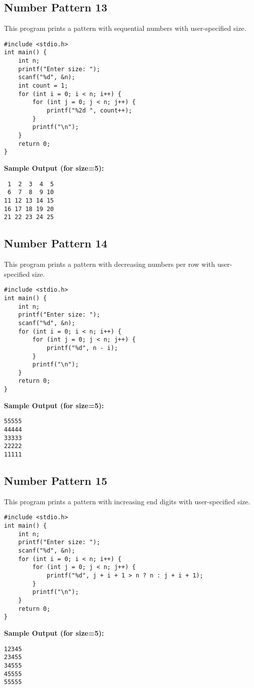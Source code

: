 \documentclass[a4paper,12pt]{article}
\begin{document}
\subsection{Number Pattern 13}
This program prints a pattern with sequential numbers with user-specified size.
\begin{lstlisting}[caption={Number Pattern 13}]
#include <stdio.h>
int main() {
    int n;
    printf("Enter size: ");
    scanf("%d", &n);
    int count = 1;
    for (int i = 0; i < n; i++) {
        for (int j = 0; j < n; j++) {
            printf("%2d ", count++);
        }
        printf("\n");
    }
    return 0;
}
\end{lstlisting}
\textbf{Sample Output (for size=5):}
\begin{verbatim}
 1  2  3  4  5 
 6  7  8  9 10 
11 12 13 14 15 
16 17 18 19 20 
21 22 23 24 25 
\end{verbatim}
\clearpage

\subsection{Number Pattern 14}
This program prints a pattern with decreasing numbers per row with user-specified size.
\begin{lstlisting}[caption={Number Pattern 14}]
#include <stdio.h>
int main() {
    int n;
    printf("Enter size: ");
    scanf("%d", &n);
    for (int i = 0; i < n; i++) {
        for (int j = 0; j < n; j++) {
            printf("%d", n - i);
        }
        printf("\n");
    }
    return 0;
}
\end{lstlisting}
\textbf{Sample Output (for size=5):}
\begin{verbatim}
55555
44444
33333
22222
11111
\end{verbatim}
\clearpage

\subsection{Number Pattern 15}
This program prints a pattern with increasing end digits with user-specified size.
\begin{lstlisting}[caption={Number Pattern 15}]
#include <stdio.h>
int main() {
    int n;
    printf("Enter size: ");
    scanf("%d", &n);
    for (int i = 0; i < n; i++) {
        for (int j = 0; j < n; j++) {
            printf("%d", j + i + 1 > n ? n : j + i + 1);
        }
        printf("\n");
    }
    return 0;
}
\end{lstlisting}
\textbf{Sample Output (for size=5):}
\begin{verbatim}
12345
23455
34555
45555
55555
\end{verbatim}
\clearpage
\end{document}

